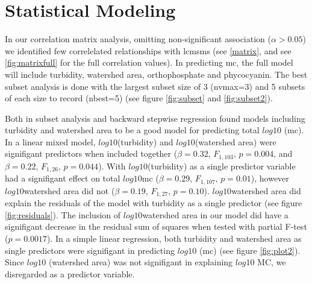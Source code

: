 \clearpage

\section{Statistical Modeling}

In our correlation matrix analysis, omitting non-significant association ($\alpha>0.05$) we identified few correlelated relationships with \gls{lcmsms} (see \ref{matrix}, and see \ref{fig:matrixfull} for the full correlation values). In predicting \gls{mc}, the full model will include turbidity, watershed area, orthophosphate and phycocyanin. The best subset analysis is done with the largest subset size of 3 (nvmax=3) and 5 subsets of each size to record (nbest=5) (see figure \ref{fig:subset} and \ref{fig:subset2}).




Both in subset analysis and backward stepwise regression found models including turbidity and watershed area to be a good model for predicting total $log10$ (\gls{mc}). In a linear mixed model, $log10$(turbidity) and $log10$(watershed area) were signifigant predictors when included together ($\beta=0.32$, $F_{{1,103}}$, $p=0.004$, and $\beta=0.22$, $F_{{1,26}}$, $p=0.044$). With $log10$(turbidity) as a single predictor variable had a signifigant effect on total $log10$\gls{mc} ($\beta=0.29$, $F_{{1,107}}$, $p=0.01$), however $log10$watershed area did not ($\beta=0.19$, $F_{{1,27}}$, $p=0.10$).  $log10$watershed area did explain the residuals of the model with turbidity as a single predictor (see figure \ref{fig:residuals}). The inclusion of $log10$watershed area in our model did have a signifigant decrease in the residual sum of squares when tested with partial F-test ($p=0.0017$). In a simple linear regression, both turbidity and watershed area as single predictors were signifigant in predicting $log10$ (\gls{mc}) (see figure \ref{fig:plot2}). Since $log10$ (watershed area) was not signifigant in explaining $log10$ MC, we disregarded as a predictor variable.

